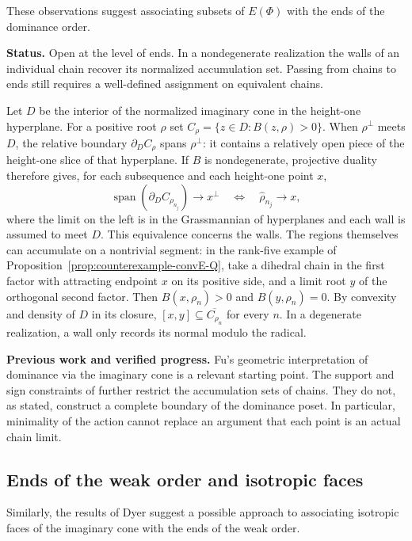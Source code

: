 \documentclass[11pt,reqno]{amsart}
\theoremstyle{plain}
\theoremstyle{definition}
\theoremstyle{remark}
\numberwithin{equation}{section}
\begin{document}
These observations suggest associating subsets of
$E(\Phi)$ with the ends of the dominance order.


\par\medskip
\noindent\textbf{Status.} Open at the level of ends. In a nondegenerate realization the
walls of an individual chain recover its normalized accumulation set.
Passing from chains to ends still requires a well-defined assignment
on equivalent chains.

Let $D$ be the interior of the normalized imaginary cone in the
height-one hyperplane. For a positive root $\rho$ set
$C_\rho=\{z\in D:B(z,\rho)>0\}$. When $\rho^\perp$ meets $D$,
the relative boundary $\partial_D C_\rho$ spans $\rho^\perp$:
it contains a relatively open piece of the height-one slice of that
hyperplane. If $B$ is nondegenerate, projective duality therefore gives,
for each subsequence and each height-one point $x$,
\[
 \operatorname{span}(\partial_D C_{\rho_{n_j}})\longrightarrow x^\perp
 \quad\Longleftrightarrow\quad \widehat{\rho}_{n_j}\longrightarrow x,
\]
where the limit on the left is in the Grassmannian of hyperplanes and
each wall is assumed to meet $D$. This equivalence concerns the walls.
The regions themselves can accumulate on a nontrivial segment: in the
rank-five example of Proposition~\ref{prop:counterexample-convE-Q},
take a dihedral chain in the first factor with attracting endpoint $x$
on its positive side, and a limit root $y$ of the orthogonal second
factor. Then $B(x,\rho_n)>0$ and $B(y,\rho_n)=0$. By convexity and
density of $D$ in its closure, $[x,y]\subseteq\overline{C_{\rho_n}}$
for every $n$. In a degenerate realization, a wall only records its
normal modulo the radical.

\par\medskip
\noindent\textbf{Previous work and verified progress.}
Fu's geometric interpretation of dominance via the imaginary cone
\cite{Fu2013} is a relevant starting point. The support and sign constraints
of \cite[Theorems~4.8 and~4.18]{FuEtAl2026} further restrict the accumulation
sets of chains. They do not, as stated, construct a complete boundary of
the dominance poset. In particular, minimality of the action cannot
replace an argument that each point is an actual chain limit.

\subsection{Ends of the weak order and isotropic faces}

Similarly, the results of Dyer suggest a possible
approach to associating isotropic faces of the imaginary
cone with the ends of the weak order.
\end{document}
